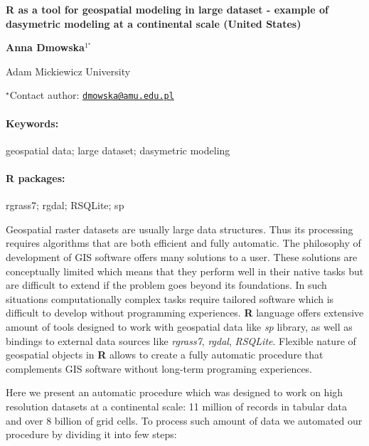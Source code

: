 \documentclass[11pt, a4paper]{article}
\renewcommand{\title}[1]{\begin{center}{\bf \LARGE #1}\end{center}}
\newcommand{\keywords}{\paragraph{Keywords:}}
\newcommand{\packages}{\paragraph{R packages:}}
\begin{document}
\pagestyle{empty}

\title{R as a tool for geospatial modeling in large dataset - example of
dasymetric modeling at a continental scale (United States)}

\begin{center}
  {\bf Anna Dmowska$^{1^\star}$}
\end{center}

\vskip 0.3cm

\begin{affiliations}
\begin{enumerate}
\begin{minipage}{0.915\textwidth}
\centering
\item Adam Mickiewicz University \\[-2pt]
\end{minipage}
\end{enumerate}
$^\star$Contact author: \href{mailto:dmowska@amu.edu.pl}{\nolinkurl{dmowska@amu.edu.pl}}\\
\end{affiliations}

\vskip 0.5cm

\begin{minipage}{0.915\textwidth}
\keywords geospatial data; large dataset; dasymetric modeling
\packages rgrass7; rgdal; RSQLite; sp
\end{minipage}

\vskip 0.8cm

Geospatial raster datasets are usually large data structures. Thus its
processing requires algorithms that are both efficient and fully
automatic. The philosophy of development of GIS software offers many
solutions to a user. These solutions are conceptually limited which
means that they perform well in their native tasks but are difficult to
extend if the problem goes beyond its foundations. In such situations
computationally complex tasks require tailored software which is
difficult to develop without programming experiences. \textbf{R}
language offers extensive amount of tools designed to work with
geospatial data like \emph{sp} library, as well as bindings to external
data sources like \emph{rgrass7}, \emph{rgdal}, \emph{RSQLite}. Flexible
nature of geospatial objects in \textbf{R} allows to create a fully
automatic procedure that complements GIS software without long-term
programing experiences.

Here we present an automatic procedure which was designed to work on
high resolution datasets at a continental scale: 11 million of records
in tabular data and over 8 billion of grid cells. To process such amount
of data we automated our procedure by dividing it into few steps:
\end{document}
